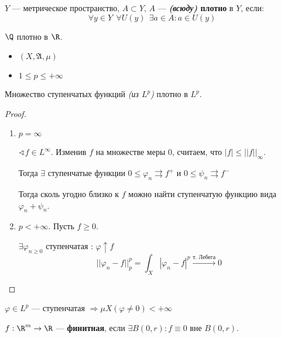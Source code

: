 \begin{theorem}
    \(Y\) --- метрическое пространство, \(A \subset Y\), \(A\) --- \textbf{\textit{(всюду)} плотно} в \(Y\), если:
    \[\forall y\in Y \ \ \forall U(y) \ \ \exists a \in A : a\in U(y)\]
\end{theorem}
\begin{example}
    \(\Q\) плотно в \(\R\).
\end{example}

\begin{lemma}\itemfix
    \begin{itemize}
        \item \((X, \mathfrak{A}, \mu)\)
        \item \(1 \leq p \leq +\infty\)
    \end{itemize}

    Множество ступенчатых функций \textit{(из \(L^p\))} плотно в \(L^p\).
\end{lemma}
\begin{proof}\itemfix
    \begin{enumerate}
        \item \(p = \infty\)

              \(\sphericalangle f\in L^{\infty}\). Изменив \(f\) на множестве меры \(0\), считаем, что \(|f| \leq ||f||_\infty\).

              Тогда \(\exists \) ступенчатые функции \(0 \leq \varphi_n \rightrightarrows f^{ +}\) и \(0 \leq \psi_n \rightrightarrows f^{ -}\)


              Тогда сколь угодно близко к \(f\) можно найти ступенчатую функцию вида \(\varphi_n + \psi_n\).

        \item \(p < +\infty\). Пусть \(f \geq 0\).

              \(\exists \varphi_{n \geq 0}\) ступенчатая : \(\varphi \uparrow f\)
              \[||\varphi_n - f||_p^p = \int_X |\varphi_n - f|^p \xrightarrow{\text{т. Лебега}} 0\]
    \end{enumerate}
\end{proof}
\begin{remark}
    \(\varphi \in L^p\) --- ступенчатая \( \Rightarrow \mu X (\varphi \neq 0) < +\infty\)
\end{remark}

\begin{definition}
    \(f : \R^m \to \R\) --- \textbf{финитная}, если \(\exists B(0, r) : f\equiv 0\) вне \(B(0, r)\).
\end{definition}


